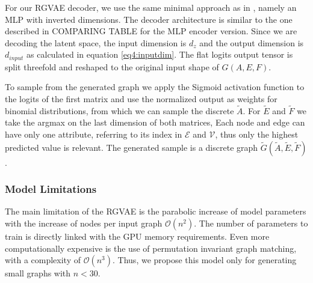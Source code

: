 For our RGVAE decoder, we use the same minimal approach as in \cite{simonovsky_graphvae_2018}, namely an MLP with inverted dimensions. The decoder architecture is similar to the one described in  COMPARING TABLE for the MLP encoder version. Since we are decoding the latent space, the input dimension is $d_z$ and the output dimension is $d_{input}$ as calculated in equation \ref{eq4:inputdim}. The flat logits output tensor is split threefold and reshaped to the original input shape of $G(A,E,F)$.   



To sample from the generated graph we apply the Sigmoid activation function to the logits of the first matrix and use the normalized output as weights for binomial distributions, from which we can sample the discrete $\tilde{A}$. For $\tilde{E}$ and $\tilde{F}$ we take the argmax on the last dimension of both matrices, Each node and edge can have only one attribute, referring to its index in $\mathcal{E}$ and $\mathcal{V}$, thus only the highest predicted value is relevant. The generated sample is a discrete graph $\tilde{G}(\tilde{A},\tilde{E},\tilde{F})$.


\subsubsection{Model Limitations}

The main limitation of the RGVAE is the parabolic increase of model parameters with the increase of nodes per input graph $\mathcal{O}(n^2)$. The number of parameters to train is directly linked with the GPU memory requirements. Even more computationally expensive is the use of permutation invariant graph matching, with a complexity of $\mathcal{O}(n^3)$. Thus, we propose this model only for generating small graphs with $n<30$.






